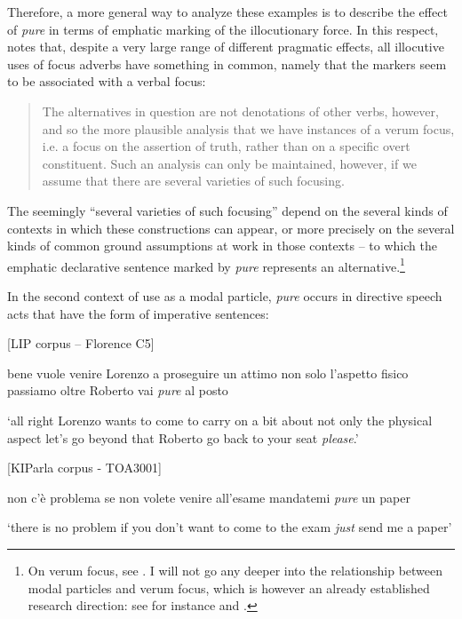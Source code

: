 Therefore, a more general way to analyze these examples is to describe the effect of \textit{pure} in terms of emphatic marking of the illocutionary force. In this respect, \citet{König2017} notes that, despite a very large range of different pragmatic effects, all illocutive uses of focus adverbs have something in common, namely that the markers seem to be associated with a verbal focus:

\begin{quote}
The alternatives in question are not denotations of other verbs, however, and so the more plausible analysis that we have instances of a verum focus, i.e. a focus on the assertion of truth, rather than on a specific overt constituent. Such an analysis can only be maintained, however, if we assume that there are several varieties of such focusing. \citep[37]{König2017}
\end{quote}

The seemingly “several varieties of such focusing” depend on the several kinds of contexts in which these constructions can appear, or more precisely on the several kinds of common ground assumptions at work in those contexts – to which the emphatic declarative sentence marked by \textit{pure} represents an alternative.\footnote{On verum focus, see \citet{Lohnstein2016}. I will not go any deeper into the relationship between modal particles and verum focus, which is however an already established research direction: see for instance \citet{Repp2013} and \citet{Abraham2017}.}

In the second context of use as a modal particle, \textit{pure} occurs in directive speech acts that have the form of imperative sentences:

\ea%
    \label{ex:key:32}

          [LIP corpus – Florence C5]

bene vuole venire Lorenzo a proseguire un attimo non solo l’aspetto fisico passiamo oltre Roberto vai \textit{pure} al posto

\glt ‘all right Lorenzo wants to come to carry on a bit about not only the physical aspect let’s go beyond that Roberto go back to your seat \textit{please}.’
    \z

\ea%
    \label{ex:key:33}

          [KIParla corpus - TOA3001]

non c’è problema se non volete venire all’esame mandatemi \textit{pure} un paper

\glt ‘there is no problem if you don’t want to come to the exam \textit{just} send me a paper’
    \z


